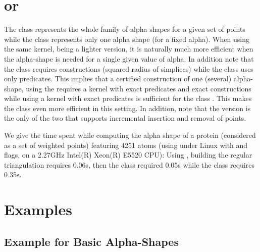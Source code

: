 \section{\texorpdfstring{ or }{Alpha\textunderscore{}shape\textunderscore{}3 or Fixed\textunderscore{}alpha\textunderscore{}shape\textunderscore{}3}}

The class  represents the whole family
of alpha shapes for a given set of points while the class 
represents only one alpha shape (for a fixed alpha). When using the same kernel,
 being a lighter version, it is naturally much more efficient 
when the alpha-shape is needed for a single given value of alpha.
In addition note that the class 
requires constructions (squared radius of simplices) while the 
class  uses only predicates.
This implies that a certified construction of one (several)
alpha-shape, using the  requires a kernel
with exact predicates and exact constructions while using a kernel 
with exact predicates is sufficient for the class .
This makes the class  even more efficient in this setting.
In addition, note that the  version is the only of the
two that supports incremental insertion and removal of points.

We give the time spent while computing the alpha shape of a protein (considered
as a set of weighted points) featuring 4251 atoms (using  under Linux with 
and  flags, on a 2.27GHz Intel(R) Xeon(R) E5520 CPU): 
Using , building
the regular triangulation requires 0.06s, then the class 
required 0.05s while the class  requires 0.35s.






\section{Examples}
\subsection{Example for Basic Alpha-Shapes\label{I1_SectClassicAS3D}}

